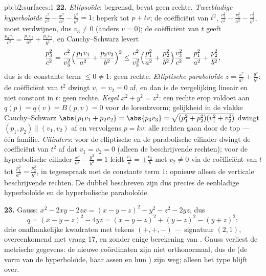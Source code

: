 \begin{solution}{pb:b2:surfaces:1}
\textbf{22.} \emph{Ellipsoïde}: begrensd, bevat geen rechte.
\emph{Tweebladige hyperboloïde} $\frac{z^2}{c^2} - \frac{x^2}{a^2}
- \frac{y^2}{b^2} = 1$: beperk tot $p + tv$; de coëfficiënt van
$t^2$, $\frac{v_3^2}{c^2} - \frac{v_1^2}{a^2} - \frac{v_2^2}{b^2}$,
moet verdwijnen, dus $v_3 \neq 0$ (anders $v = 0$); de coëfficiënt
van $t$ geeft $\frac{p_3v_3}{c^2} = \frac{p_1v_1}{a^2} +
\frac{p_2v_2}{b^2}$, en Cauchy--Schwarz levert
\[
\frac{p_3^2}{c^2}
= \frac{c^2}{v_3^2}\Bigl(\frac{p_1v_1}{a^2} +
\frac{p_2v_2}{b^2}\Bigr)^2
\leq \frac{c^2}{v_3^2}\Bigl(\frac{p_1^2}{a^2} +
\frac{p_2^2}{b^2}\Bigr)\frac{v_3^2}{c^2}
= \frac{p_1^2}{a^2} + \frac{p_2^2}{b^2},
\]
dus is de constante term $\leq 0 \neq 1$: geen rechte.
\emph{Elliptische paraboloïde} $z = \frac{x^2}{a^2} +
\frac{y^2}{b^2}$: de coëfficiënt van $t^2$ dwingt $v_1 = v_2 = 0$
af, en dan is de vergelijking lineair en niet constant in $t$: geen
rechte. \emph{Kegel} $x^2 + y^2 = z^2$: een rechte erop voldoet aan
$q(p) = q(v) = B(p, v) = 0$ voor de lorentzvorm; gelijkheid in de
vlakke Cauchy--Schwarz $\abs{p_1v_1 + p_2v_2} = \abs{p_3v_3} =
\sqrt{(p_1^2 + p_2^2)(v_1^2 + v_2^2)}$ dwingt $(p_1, p_2) \parallel
(v_1, v_2)$ af en vervolgens $p = kv$: alle rechten gaan door de
top --- één familie. \emph{Cilinders}: voor de elliptische en de
parabolische cilinder dwingt de coëfficiënt van $t^2$ af dat $v_1 =
v_2 = 0$ (alleen de beschrijvende rechten); voor de hyperbolische
cilinder $\frac{x^2}{a^2} - \frac{y^2}{b^2} = 1$ leidt $\frac{v_1}a
= \pm \frac{v_2}b$ met $v_2 \neq 0$ via de coëfficiënt van $t$ tot
$\frac{p_1^2}{a^2} = \frac{p_2^2}{b^2}$, in tegenspraak met de
constante term $1$: opnieuw alleen de verticale beschrijvende
rechten. De dubbel beschreven  zijn dus precies de
eenbladige hyperboloïde en de hyperbolische paraboloïde.

\textbf{23.} Gauss: $x^2 - 2xy - 2zx = (x - y - z)^2 - y^2 - z^2 -
2yz$, dus
\[
q = (x - y - z)^2 - 4yz = (x - y - z)^2 + (y - z)^2 - (y +
z)^2 :
\]
drie onafhankelijke kwadraten met tekens $(+, +, -)$ --- signatuur
$(2, 1)$, overeenkomend met vraag 17, en zonder enige berekening
van . Gauss verliest de metrische gegevens: de nieuwe
coördinaten zijn niet orthonormaal, dus de  (de vorm
van de hyperboloïde, haar assen en hun ) zijn weg; alleen
het  type blijft over.


\end{solution}
